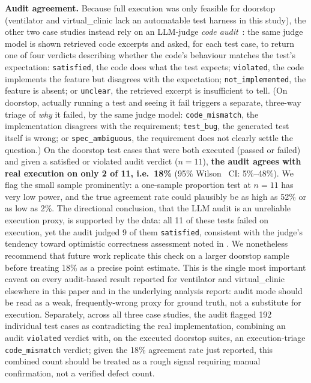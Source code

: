 \documentclass[conference]{IEEEtran}
\begin{document}
\textbf{Audit agreement.} Because full execution was only feasible for
doorstop (ventilator and virtual\_clinic lack an automatable test harness in
this study), the other two case studies instead rely on an LLM-judge
\emph{code audit}~\cite{zhuo2024icescore,tong2024codejudge}: the same judge model is shown retrieved code excerpts and
asked, for each test case, to return one of four verdicts describing whether
the code's behaviour matches the test's expectation: \texttt{satisfied}, the
code does what the test expects; \texttt{violated}, the code implements the
feature but disagrees with the expectation; \texttt{not\_implemented}, the
feature is absent; or \texttt{unclear}, the retrieved excerpt is insufficient
to tell. (On doorstop, actually running a test and seeing it fail triggers a
separate, three-way triage of \emph{why} it failed, by the same judge model:
\texttt{code\_mismatch}, the implementation disagrees with the requirement;
\texttt{test\_bug}, the generated test itself is wrong; or
\texttt{spec\_ambiguous}, the requirement does not clearly settle the
question.) On the doorstop test cases that were both executed (passed or failed) and given a
satisfied or violated audit verdict ($n=11$), \textbf{the audit agrees with real
execution on only 2 of 11, i.e.\ 18\%} (95\% Wilson~\cite{wilson1927} CI: 5\%--48\%). We flag the small sample
prominently: a one-sample proportion test at $n=11$ has very low power, and
the true agreement rate could plausibly be as high as 52\% or as low as 2\%.
The directional conclusion, that the LLM audit is an unreliable execution
proxy, is supported by the data: all 11 of these tests failed on execution, yet the
audit judged 9 of them \texttt{satisfied}, consistent with the
judge's tendency toward optimistic correctness assessment noted in
\cite{zheng2023judging,wang2024notfair}. We nonetheless recommend that future work replicate
this check on a larger doorstop sample before treating 18\% as a precise
point estimate. This is the single most important caveat on every
audit-based result reported for ventilator and virtual\_clinic elsewhere in
this paper and in the underlying analysis report: audit mode should be read
as a weak, frequently-wrong proxy for ground truth, not a substitute for
execution. Separately, across all three case studies, the audit flagged 192
individual test cases as contradicting the real implementation, combining an
audit \texttt{violated} verdict with, on the executed doorstop suites, an
execution-triage \texttt{code\_mismatch} verdict; given the 18\% agreement
rate just reported, this combined count should be treated as a rough signal
requiring manual confirmation, not a verified defect count.
\end{document}
